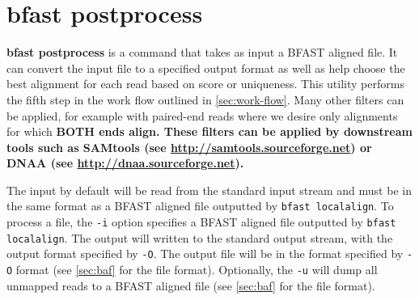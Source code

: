 \documentclass[a4paper,12pt]{book}
\newcommand{\TT}[1]{{\tt #1}} %
\newcommand{\BF}[1]{{\bf #1}} %
\newcommand{\BAF}{BFAST aligned file} %
\begin{document}
%
%
\section{bfast postprocess}
\label{sec:postprocess}
\BF{bfast postprocess} is a command that takes as input a \BAF{}.
It can convert the input file to a specified output format as well as help choose the best alignment for each read based on score or uniqueness.
This utility performs the fifth step in the work flow outlined in \autoref{sec:work-flow}.
Many other filters can be applied, for example with paired-end reads where we desire only alignments for which \bf{BOTH} ends align. 
These filters can be applied by downstream tools such as SAMtools (see \url{http://samtools.sourceforge.net}) or DNAA (see \url{http://dnaa.sourceforge.net}).

The input by default will be read from the standard input stream and must be in the same format as a \BAF{} outputted by \TT{bfast localalign}.
To process a file, the \TT{-i} option specifies a \BAF{} outputted by \TT{bfast localalign}.
The output will written to the standard output stream, with the output format specified by \TT{-O}.
The output file will be in the format specified by \TT{-O} format (see \autoref{sec:baf} for the file format).
Optionally, the \TT{-u} will dump all unmapped reads to a \BAF{} (see \autoref{sec:baf} for the file format).
\end{document}
